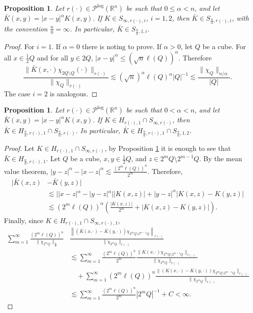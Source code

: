 \documentclass[a4paper,11pt,reqno]{amsart}
\theoremstyle{plain}
\numberwithin{equation}{section}
\newtheorem{propo}[teo]{Proposition}
\theoremstyle{definition}
\newcommand{\R}{{\mathbb{R}^n}}
\begin{document}
\begin{propo}\label{nucleo en S_Br}
	Let $r(\cdot)\in\mathcal{P}^{\text{log}}(\R)$ be such that $0\leq\alpha<n$, and let $\bar{K}(x,y)=|x-y|^\alpha K(x,y)$. If $K\in S_{\infty,r(\cdot),i}$, $i=1,2$, then $\bar{K}\in S_{\frac{n}{\alpha},{r(\cdot)},i}$, with the convention $\frac{n}{0}=\infty$. In particular, $\bar{K}\in S_{\frac{n}{\alpha},1,i}$.
\end{propo}
\begin{proof}
	For $i=1$. If $\alpha=0$ there is noting to prove. If $\alpha>0$, let $Q$ be a cube. For all $x\in\frac{1}{2}Q$ and for all $y\in 2Q$, $|x-y|^\alpha\leq (\sqrt{n}\ell(Q))^\alpha$. Therefore 
	\begin{equation*}
	\frac{\|\bar{K}(x,\cdot)\chi_{2Q\setminus Q}(\cdot)\|_{r(\cdot)}}{\|\chi_{Q}\|_{r(\cdot)}}\lesssim \left(\sqrt{n}\right)^\alpha \ell(Q)^\alpha |Q|^{-1}\lesssim\frac{\|\chi_{Q}\|_{n/\alpha}}{|Q|}. 
	\end{equation*}	
	The case $i=2$ is analogous.
\end{proof}
\begin{propo}\label{construcion kernel}
	Let $r(\cdot)\in\mathcal{P}^{\text{log}}(\R)$ be such that $0<\alpha<n$, and let $\bar{K}(x,y)=|x-y|^\alpha K(x,y)$. If $K\in H_{{r(\cdot)},1}\cap S_{\infty,{r(\cdot)}}$, then $\bar{K}\in H_{\frac{n}{\alpha},{r(\cdot)},1}\cap S_{\frac{n}{\alpha},{r(\cdot)}}$. In particular, $\bar{K}\in H_{\frac{n}{\alpha},{r(\cdot)},1}\cap S_{\frac{n}{\alpha},1,2}$.
\end{propo}
\begin{proof}
	Let $K\in H_{{r(\cdot)},1}\cap S_{\infty,{r(\cdot)}}$, by Proposition \ref{nucleo en S_Br} it is enough to see that $\bar{K}\in H_{\frac{n}{\alpha},{r(\cdot)},1}$. Let $Q$ be a cube, $x,y\in\frac{1}{2}Q$, and $z\in2^mQ\setminus2^{m-1}Q$. By the mean value theorem, $|y-z|^\alpha-|x-z|^\alpha\lesssim \frac{(2^m \ell(Q))^\alpha}{2^m}$. Therefore,
	\begin{align*}
	|\bar{K}(x,z)&-\bar{K}(y,z)|\\
	&\lesssim ||x-z|^\alpha-|y-z|^\alpha||K(x,z)|+|y-z|^\alpha |K(x,z)-K(y,z)|\\
	&\lesssim (2^m \ell(Q))^\alpha\left( \frac{|K(x,z)|}{2^m}+|K(x,z)-K(y,z)|  \right).
	\end{align*}
	Finally, since $K\in H_{r(\cdot),1}\cap S_{\infty,r(\cdot),1}$,
	\begin{align*}
	\sum_{m=1}^{\infty}\frac{\left(2^m \ell(Q)\right)^n}{\|\chi_{2^mQ}\|_{\frac{n}{\alpha}}}&\frac{\left\|(\bar{K}(x,\cdot)-\bar{K}(y,\cdot))\chi_{2^mQ\setminus2^{m-1}Q}\right\|_{r(\cdot)}}{\|\chi_{2^mQ}\|_{r(\cdot)}}\\
	&\lesssim \sum_{m=1}^{\infty}\frac{(2^m\ell(Q))^{n}}{2^m}\frac{\|K(x,\cdot)\chi_{2^mQ\setminus2^{m-1}Q}\|_{r(\cdot)}}{\|\chi_{2^mQ}\|_{r(\cdot)}}\\
	&\quad+\sum_{m=1}^{\infty}\left(2^m\ell(Q)\right)^n\frac{\|(K(x,\cdot)-K(y,\cdot))\chi_{2^mQ\setminus2^{m-1}Q}\|_{r(\cdot)}}{\|\chi_{2^mQ}\|_{r(\cdot)}}\\
	&\lesssim \sum_{m=1}^{\infty}\frac{(2^m\ell(Q))^{n}}{2^m}|2^mQ|^{-1}+C<\infty.
	\end{align*}	
\end{proof}
\end{document}
